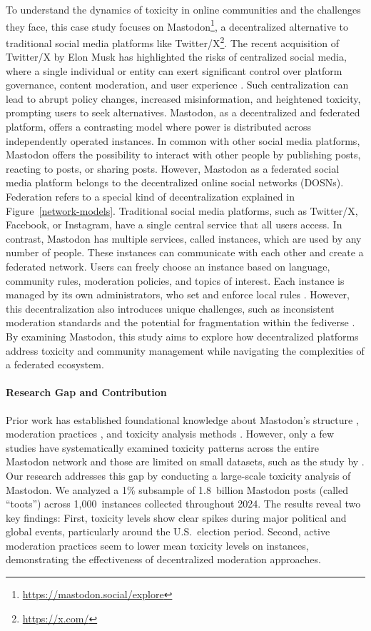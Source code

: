 To understand the dynamics of toxicity in online communities and the challenges they face, this case study focuses on Mastodon\footnote{\url{https://mastodon.social/explore}}, a decentralized alternative to traditional social media platforms like Twitter/X\footnote{\url{https://x.com/}}. The recent acquisition of Twitter/X by Elon Musk has highlighted the risks of centralized social media, where a single individual or entity can exert significant control over platform governance, content moderation, and user experience \cite{he:2023}. Such centralization can lead to abrupt policy changes, increased misinformation, and heightened toxicity, prompting users to seek alternatives. Mastodon, as a decentralized and federated platform, offers a contrasting model where power is distributed across independently operated instances. In common with other social media platforms, Mastodon offers the possibility to interact with other people by publishing posts, reacting to posts, or sharing posts. However, Mastodon as a federated social media platform belongs to the decentralized online social networks (DOSNs). Federation refers to a special kind of decentralization explained in Figure~\ref{network-models}. Traditional social media platforms, such as Twitter/X, Facebook, or Instagram, have a single central service that all users access. In contrast, Mastodon has multiple services, called instances, which are used by any number of people. These instances can communicate with each other and create a federated network. Users can freely choose an instance based on language, community rules, moderation policies, and topics of interest. Each instance is managed by its own administrators, who set and enforce local rules \cite{mastodon:docs}. However, this decentralization also introduces unique challenges, such as inconsistent moderation standards and the potential for fragmentation within the fediverse \cite{he:2023}. By examining Mastodon, this study aims to explore how decentralized platforms address toxicity and community management while navigating the complexities of a federated ecosystem.

\paragraph{Research Gap and Contribution}
Prior work has established foundational knowledge about Mastodon's structure \cite{zulli:2020,la_cava:2021}, moderation practices \cite{bono:2024,nicholson:2023}, and toxicity analysis methods \cite{fan:2022}. However, only a few studies have systematically examined toxicity patterns across the entire Mastodon network and those are limited on small datasets, such as the study by \citet{al-khateeb:2022}. Our research addresses this gap by conducting a large-scale toxicity analysis of Mastodon. We analyzed a 1\% subsample of 1.8~billion Mastodon posts (called ``toots'') across 1,000~instances collected throughout 2024. The results reveal two key findings: First, toxicity levels show clear spikes during major political and global events, particularly around the U.S.~election period. Second, active moderation practices seem to lower mean toxicity levels on instances, demonstrating the effectiveness of decentralized moderation approaches.

\enlargethispage{\baselineskip}